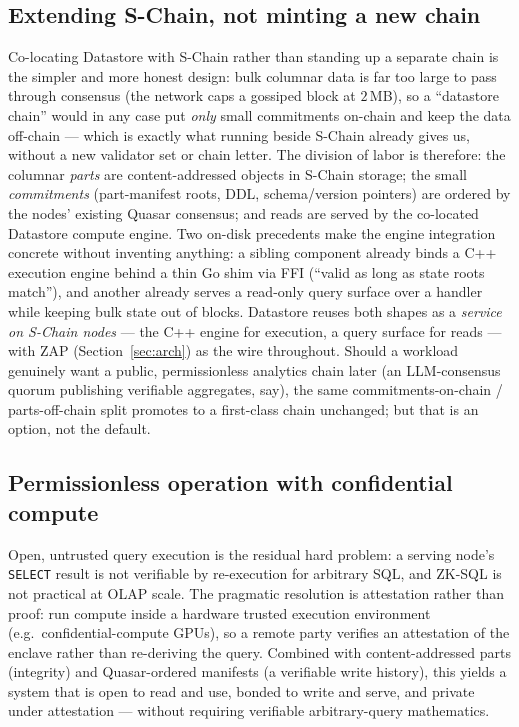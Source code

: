 \subsection{Extending S-Chain, not minting a new chain}

Co-locating Datastore with S-Chain rather than standing up a separate chain is
the simpler and more honest design: bulk columnar data is far too large to pass
through consensus (the network caps a gossiped block at $2$\,MB), so a
``datastore chain'' would in any case put \emph{only} small commitments on-chain
and keep the data off-chain --- which is exactly what running beside S-Chain
already gives us, without a new validator set or chain letter. The division of
labor is therefore: the columnar \emph{parts} are content-addressed objects in
S-Chain storage; the small \emph{commitments} (part-manifest roots, DDL,
schema/version pointers) are ordered by the nodes' existing Quasar consensus; and
reads are served by the co-located Datastore compute engine. Two on-disk
precedents make the engine integration concrete without inventing anything: a
sibling component already binds a C++ execution engine behind a thin Go shim via
FFI (``valid as long as state roots match''), and another already serves a
read-only query surface over a handler while keeping bulk state out of blocks.
Datastore reuses both shapes as a \emph{service on S-Chain nodes} --- the C++
engine for execution, a query surface for reads --- with ZAP
(Section~\ref{sec:arch}) as the wire throughout. Should a workload genuinely want
a public, permissionless analytics chain later (an LLM-consensus quorum
publishing verifiable aggregates, say), the same commitments-on-chain /
parts-off-chain split promotes to a first-class chain unchanged; but that is an
option, not the default.

\subsection{Permissionless operation with confidential compute}

Open, untrusted query execution is the residual hard problem: a serving node's
\texttt{SELECT} result is not verifiable by re-execution for arbitrary SQL, and
ZK-SQL is not practical at OLAP scale. The pragmatic resolution is
attestation rather than proof: run compute inside a hardware trusted execution
environment (e.g.\ confidential-compute GPUs), so a remote party verifies an
attestation of the enclave rather than re-deriving the query. Combined with
content-addressed parts (integrity) and Quasar-ordered manifests (a verifiable
write history), this yields a system that is open to read and use, bonded to
write and serve, and private under attestation --- without requiring verifiable
arbitrary-query mathematics.

